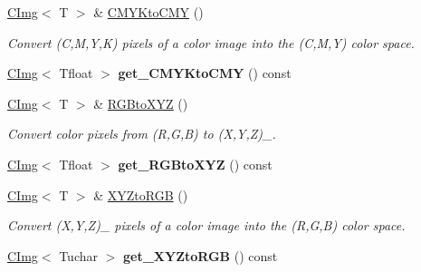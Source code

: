 \begin{DoxyCompactItemize}
\item 
\hypertarget{structcimg__library_1_1CImg_ae3827dc11a003ee30b1cd74ed7b74e15}{
\hyperlink{structcimg__library_1_1CImg}{CImg}$<$ T $>$ \& \hyperlink{structcimg__library_1_1CImg_ae3827dc11a003ee30b1cd74ed7b74e15}{CMYKtoCMY} ()}
\label{structcimg__library_1_1CImg_ae3827dc11a003ee30b1cd74ed7b74e15}

\begin{DoxyCompactList}\small\item\em Convert (C,M,Y,K) pixels of a color image into the (C,M,Y) color space. \item\end{DoxyCompactList}\item 
\hypertarget{structcimg__library_1_1CImg_ae25db14c1b893a9e7c0536b71840ee87}{
\hyperlink{structcimg__library_1_1CImg}{CImg}$<$ Tfloat $>$ {\bfseries get\_\-CMYKtoCMY} () const }
\label{structcimg__library_1_1CImg_ae25db14c1b893a9e7c0536b71840ee87}

\item 
\hypertarget{structcimg__library_1_1CImg_a70c6c7a5d8ed24b2e618ab89f2dbadda}{
\hyperlink{structcimg__library_1_1CImg}{CImg}$<$ T $>$ \& \hyperlink{structcimg__library_1_1CImg_a70c6c7a5d8ed24b2e618ab89f2dbadda}{RGBtoXYZ} ()}
\label{structcimg__library_1_1CImg_a70c6c7a5d8ed24b2e618ab89f2dbadda}

\begin{DoxyCompactList}\small\item\em Convert color pixels from (R,G,B) to (X,Y,Z)\_. \item\end{DoxyCompactList}\item 
\hypertarget{structcimg__library_1_1CImg_ad2c17aaaeae97c1ef498f3668ce5d177}{
\hyperlink{structcimg__library_1_1CImg}{CImg}$<$ Tfloat $>$ {\bfseries get\_\-RGBtoXYZ} () const }
\label{structcimg__library_1_1CImg_ad2c17aaaeae97c1ef498f3668ce5d177}

\item 
\hypertarget{structcimg__library_1_1CImg_a6ec1861cb810ee3df63c6ef85cf270d8}{
\hyperlink{structcimg__library_1_1CImg}{CImg}$<$ T $>$ \& \hyperlink{structcimg__library_1_1CImg_a6ec1861cb810ee3df63c6ef85cf270d8}{XYZtoRGB} ()}
\label{structcimg__library_1_1CImg_a6ec1861cb810ee3df63c6ef85cf270d8}

\begin{DoxyCompactList}\small\item\em Convert (X,Y,Z)\_ pixels of a color image into the (R,G,B) color space. \item\end{DoxyCompactList}\item 
\hypertarget{structcimg__library_1_1CImg_a6ce72ccd76ed2feccfefcc11f49feace}{
\hyperlink{structcimg__library_1_1CImg}{CImg}$<$ Tuchar $>$ {\bfseries get\_\-XYZtoRGB} () const }
\label{structcimg__library_1_1CImg_a6ce72ccd76ed2feccfefcc11f49feace}


\end{DoxyCompactItemize}
